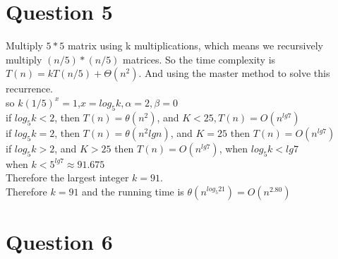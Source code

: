 \documentclass[paper=a4, fontsize=11pt]{scrartcl} %
\numberwithin{equation}{section} %
\numberwithin{figure}{section} %
\numberwithin{table}{section} %
\begin{document}
\vspace{2cm}
\section{Question 5}
Multiply $5*5$ matrix using k multiplications, which means we recursively multiply $(n/5)*(n/5)$ matrices. So the time complexity is $T(n)=kT(n/5)+\Theta({n^2})$. And using the master method to solve this recurrence.\\
so $k{(1/5)}^x=1$,$ x=log_5 k, \alpha=2, \beta=0$\\
if $log_5 k<2$, then $T(n)=\theta(n^2)$, and $K<25, T(n)=O({n}^{lg7})$\\
if $log_5 k=2$, then $T(n)=\theta{(n^{2}lgn)}$, and $K=25$ then $T(n)=O({n}^{lg7})$\\
if $log_5 k>2$, and $K>25$ then $T(n)=O({n}^{lg7})$, when $log_5 k < lg7$\\
when $ k<{5}^{lg7}\approx 91.675 $\\
Therefore the largest integer $k=91 $.\\
Therefore $k=91$ and the running time is $\theta({n}^{log_5 21})=O(n^{2.80})$



\vspace{2cm}
\section{Question 6}
\end{document}
